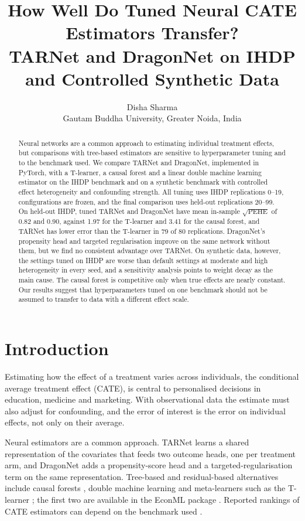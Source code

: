 \documentclass[10pt]{article}
\title{How Well Do Tuned Neural CATE Estimators Transfer?\\
TARNet and DragonNet on IHDP and Controlled Synthetic Data}
\author{Disha Sharma\\
Gautam Buddha University, Greater Noida, India}
\date{}
\begin{document}
\maketitle

\begin{abstract}
Neural networks are a common approach to estimating individual treatment effects, but comparisons with tree-based estimators are sensitive to hyperparameter tuning and to the benchmark used. We compare TARNet and DragonNet, implemented in PyTorch, with a T-learner, a causal forest and a linear double machine learning estimator on the IHDP benchmark and on a synthetic benchmark with controlled effect heterogeneity and confounding strength. All tuning uses IHDP replications 0--19, configurations are frozen, and the final comparison uses held-out replications 20--99. On held-out IHDP, tuned TARNet and DragonNet have mean in-sample $\sqrt{\mathrm{PEHE}}$ of 0.82 and 0.90, against 1.97 for the T-learner and 3.41 for the causal forest, and TARNet has lower error than the T-learner in 79 of 80 replications. DragonNet's propensity head and targeted regularisation improve on the same network without them, but we find no consistent advantage over TARNet. On synthetic data, however, the settings tuned on IHDP are worse than default settings at moderate and high heterogeneity in every seed, and a sensitivity analysis points to weight decay as the main cause. The causal forest is competitive only when true effects are nearly constant. Our results suggest that hyperparameters tuned on one benchmark should not be assumed to transfer to data with a different effect scale.
\end{abstract}

\section{Introduction}

Estimating how the effect of a treatment varies across individuals, the conditional average treatment effect (CATE), is central to personalised decisions in education, medicine and marketing. With observational data the estimate must also adjust for confounding, and the error of interest is the error on individual effects, not only on their average.

Neural estimators are a common approach. TARNet \citep{shalit2017estimating} learns a shared representation of the covariates that feeds two outcome heads, one per treatment arm, and DragonNet \citep{shi2019adapting} adds a propensity-score head and a targeted-regularisation term on the same representation. Tree-based and residual-based alternatives include causal forests \citep{wager2018estimation}, double machine learning \citep{chernozhukov2018double} and meta-learners such as the T-learner \citep{kunzel2019metalearners}; the first two are available in the EconML package \citep{battocchi2019econml}. Reported rankings of CATE estimators can depend on the benchmark used \citep{curth2021really}.
\end{document}
